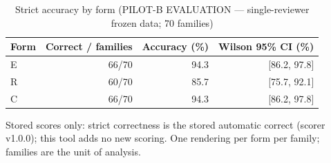 \begin{table}[t]
\centering
\small
\caption{Strict accuracy by form (PILOT-B EVALUATION --- single-reviewer frozen data; 70 families)}
\label{tab:pilotb-Qwen3-4B-accuracy}
\begin{tabular}{lrrr}
\toprule
Form & Correct / families & Accuracy (\%) & Wilson 95\% CI (\%) \\
\midrule
E & 66/70 & 94.3 & [86.2, 97.8] \\
R & 60/70 & 85.7 & [75.7, 92.1] \\
C & 66/70 & 94.3 & [86.2, 97.8] \\
\bottomrule
\end{tabular}
\par\smallskip
\parbox{\linewidth}{\footnotesize Stored scores only: strict correctness is the stored automatic correct (scorer v1.0.0); this tool adds no new scoring. One rendering per form per family; families are the unit of analysis.}
\end{table}
